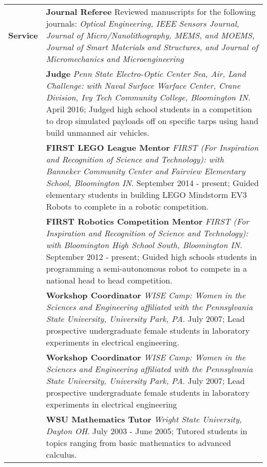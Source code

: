 \documentclass{article}[16pt]
\newlength{\lcolw}
\newlength{\rcolw}
\newlength{\hlcolw}
\begin{document}
\begin{tabular}{L{\hlcolw}  L{\rcolw}}
\textbf{\Large Service} 
& \textbf{Journal Referee} Reviewed manuscripts for the following journals: {\it Optical Engineering, IEEE Sensors Journal, Journal of Micro/Nanolithography, MEMS, and MOEMS, Journal of Smart Materials and Structures, and Journal of Micromechanics and Microengineering}
\vspace{0.1in} \\ 
& \textbf{Judge} {\it Penn State Electro-Optic Center Sea, Air, Land Challenge: with Naval Surface Warface Center, Crane Division, Ivy Tech Community College, Bloomington IN}. April 2016; Judged high school students in a competition to drop simulated payloads off on specific tarps using hand build unmanned air vehicles.
\vspace{0.1in} \\ 
& \textbf{FIRST LEGO League Mentor} {\it FIRST (For Inspiration and Recognition of Science and Technology): with Banneker Community Center and Fairview Elementary School, Bloomington IN}. September 2014 - present; Guided elementary students in building LEGO Mindstorm EV3 Robots to complete in a robotic competition.
\vspace{0.1in} \\ 
& \textbf{FIRST Robotics Competition Mentor} {\it FIRST (For Inspiration and Recognition of Science and Technology): with Bloomington High School South, Bloomington IN}. September 2012 - present; Guided high schools students in programming a semi-autonomous robot to compete in a national head to head competition.
\vspace{0.1in} \\ 
& \textbf{Workshop Coordinator} {\it WISE Camp: Women in the Sciences and Engineering affiliated with the Pennsylvania State University, University Park, PA}. July 2007; Lead prospective undergraduate female students in laboratory experiments in electrical engineering.
\vspace{0.1in} \\ 
& \textbf{Workshop Coordinator} {\it WISE Camp: Women in the Sciences and Engineering affiliated with the Pennsylvania State University, University Park, PA}. July 2007; Lead prospective undergraduate female students in laboratory experiments in electrical engineering
\vspace{0.1in} \\ 
& \textbf{WSU Mathematics Tutor} {\it Wright State University, Dayton OH}. July 2003 - June 2005; Tutored students in topics ranging from basic mathematics to advanced calculus.

\end{tabular}
\end{document}
